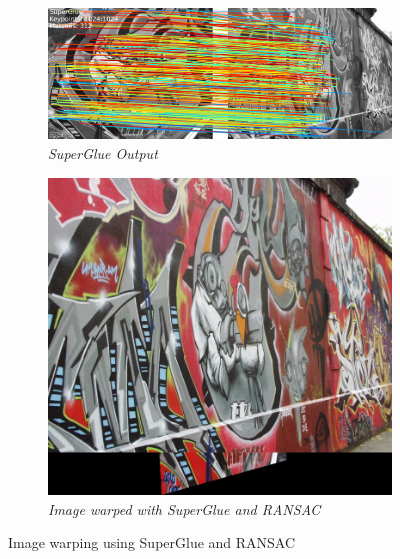 \documentclass[11pt, a4paper]{article}
\begin{document}
\begin{figure}[H]
	\centering
	\begin{subfigure}[b]{0.65\textwidth}
		\centering
		\includegraphics[width=\textwidth]{./SuperGluePretrainedNetwork-master/graffiti/output/img1_img5_matches.png}
		\caption{{\small \textit{SuperGlue Output}}}
		\label{fig:spout1}
	\end{subfigure}
	\hfill
	\begin{subfigure}[b]{0.3\textwidth}
		\centering
		\includegraphics[width=\textwidth]{./images/Bonusim1Warp.jpg}
		\caption{{\small \textit{Image warped with SuperGlue and RANSAC}}}
		\label{fig:out5a}
	\end{subfigure}
	\caption{Image warping using SuperGlue and RANSAC}
\end{figure}
\end{document}
